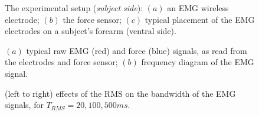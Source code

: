 \documentclass[10pt]{bmc_article}
\def\texttt{[image: ]}
\newenvironment{bmcformat}{\begin{raggedright}\baselineskip20pt\sloppy\setboolean{publ}{false}}{\end{raggedright}\baselineskip20pt\sloppy}
\begin{document}
\begin{bmcformat}
\begin{figure}[!ht] \centering
  \caption{The experimental setup (\textit{subject side}): $(a)$ an EMG
    wireless electrode; $(b)$ the force sensor; $(c)$ typical
    placement of the EMG electrodes on a subject's forearm (ventral side).}
  \label{fig:SubjSetup}
\end{figure}


\begin{figure}[!ht] \centering
  \caption{$(a)$ typical raw EMG (red) and force (blue) signals, as read from the
    electrodes and force sensor; $(b)$ frequency diagram of the EMG signal.}
  \label{fig:spectra}
\end{figure}

\begin{figure}[!ht] \centering
  \caption{(left to right) effects of the RMS on the bandwidth of the EMG
    signals, for $T_{RMS} = 20, 100, 500ms$.}
  \label{fig:RMSs}
\end{figure}


\end{bmcformat}
\end{document}
